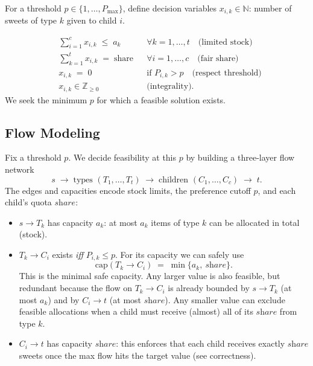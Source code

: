 \documentclass[a4paper,12pt,headsepline]{scrartcl}
\begin{document}
For a threshold $p \in \{1,\dots,P_{\max}\}$, define decision variables $x_{i,k} \in \mathbb{N}$: number of sweets of type $k$ given to child $i$.

\[
\begin{aligned}
&\sum_{i=1}^c x_{i,k} \;\le\; a_k && \forall k=1,\dots,t \quad \text{(limited stock)} \\
&\sum_{k=1}^t x_{i,k} \;=\; \text{share} && \forall i=1,\dots,c \quad \text{(fair share)} \\
&x_{i,k} \;=\; 0 && \text{if } P_{i,k} > p \quad \text{(respect threshold)} \\
&x_{i,k} \in \mathbb{Z}_{\ge 0} && \text{(integrality).}
\end{aligned}
\]
We seek the minimum $p$ for which a feasible solution exists.
\vspace{0.3em}




\subsection{Flow Modeling}

Fix a threshold \(p\). We decide feasibility at this \(p\) by building a three-layer flow network
\[
s \;\longrightarrow\; \text{types }(T_1,\ldots,T_t) \;\longrightarrow\; \text{children }(C_1,\ldots,C_c) \;\longrightarrow\; t .
\]
The edges and capacities encode stock limits, the preference cutoff \(p\), and each child’s quota \(\textit{share}\):

\begin{itemize}
  \item \(s \to T_k\) has capacity \(a_k\): at most \(a_k\) items of type \(k\) can be allocated in total (stock).
  \item \(T_k \to C_i\) exists \emph{iff} \(P_{i,k} \le p\). For its capacity we can safely use
  \[
  \mathrm{cap}(T_k \!\to\! C_i) \;=\; \min\{a_k,\ \textit{share}\}.
  \]
This is the minimal safe capacity. Any larger value is also feasible, but redundant because the flow on $T_k\!\to\!C_i$ is already bounded by $s\!\to\!T_k$ (at most $a_k$) and by $C_i\!\to\!t$ (at most $\textit{share}$). Any smaller value can exclude feasible allocations when a child must receive (almost) all of its $\textit{share}$ from type $k$.
  \item \(C_i \to t\) has capacity \(\textit{share}\): this enforces that each child receives exactly \(\textit{share}\) sweets once the max flow hits the target value (see correctness).
\end{itemize}
\end{document}
